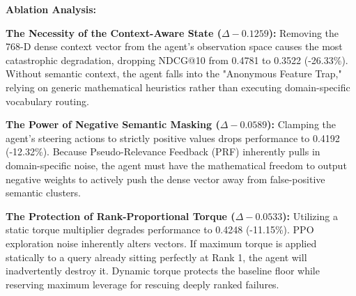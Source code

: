 \begin{table}[htbp]
  \caption{Ablation Studies}
  \begin{center}
  \end{center}
  \label{tab:ablation}
\end{table}

\textbf{Ablation Analysis:}

\textbf{The Necessity of the Context-Aware State ($\Delta -0.1259$):} Removing the 768-D dense context vector from the agent's observation space causes the most catastrophic degradation, dropping NDCG@10 from 0.4781 to 0.3522 (-26.33\%). Without semantic context, the agent falls into the "Anonymous Feature Trap," relying on generic mathematical heuristics rather than executing domain-specific vocabulary routing.

\textbf{The Power of Negative Semantic Masking ($\Delta -0.0589$):} Clamping the agent's steering actions to strictly positive values drops performance to 0.4192 (-12.32\%). Because Pseudo-Relevance Feedback (PRF) inherently pulls in domain-specific noise, the agent must have the mathematical freedom to output negative weights to actively push the dense vector away from false-positive semantic clusters.

\textbf{The Protection of Rank-Proportional Torque ($\Delta -0.0533$):} Utilizing a static torque multiplier degrades performance to 0.4248 (-11.15\%). PPO exploration noise inherently alters vectors. If maximum torque is applied statically to a query already sitting perfectly at Rank 1, the agent will inadvertently destroy it. Dynamic torque protects the baseline floor while reserving maximum leverage for rescuing deeply ranked failures.

